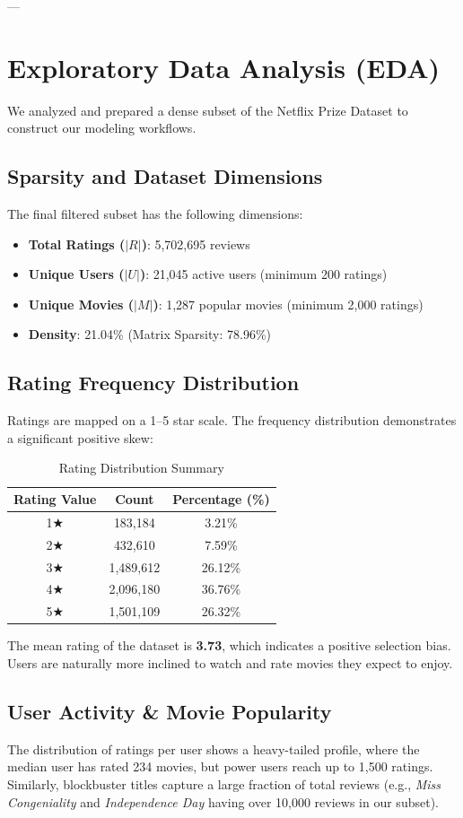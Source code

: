 \documentclass[11pt,a4paper]{article}
\begin{document}
---

\section{Exploratory Data Analysis (EDA)}
We analyzed and prepared a dense subset of the Netflix Prize Dataset to construct our modeling workflows. 

\subsection{Sparsity and Dataset Dimensions}
The final filtered subset has the following dimensions:
\begin{itemize}
    \item \textbf{Total Ratings ($|R|$)}: 5,702,695 reviews
    \item \textbf{Unique Users ($|U|$)}: 21,045 active users (minimum 200 ratings)
    \item \textbf{Unique Movies ($|M|$)}: 1,287 popular movies (minimum 2,000 ratings)
    \item \textbf{Density}: 21.04\% (Matrix Sparsity: 78.96\%)
\end{itemize}

\subsection{Rating Frequency Distribution}
Ratings are mapped on a 1--5 star scale. The frequency distribution demonstrates a significant positive skew:
\begin{table}[h]
\centering
\caption{Rating Distribution Summary}
\begin{tabular}{ccc}
\toprule
\textbf{Rating Value} & \textbf{Count} & \textbf{Percentage (\%)} \\
\midrule
1★ & 183,184 & 3.21\% \\
2★ & 432,610 & 7.59\% \\
3★ & 1,489,612 & 26.12\% \\
4★ & 2,096,180 & 36.76\% \\
5★ & 1,501,109 & 26.32\% \\
\bottomrule
\end{tabular}
\label{tab:rating_dist}
\end{table}

The mean rating of the dataset is \textbf{3.73}, which indicates a positive selection bias. Users are naturally more inclined to watch and rate movies they expect to enjoy.

\subsection{User Activity \& Movie Popularity}
The distribution of ratings per user shows a heavy-tailed profile, where the median user has rated 234 movies, but power users reach up to 1,500 ratings. Similarly, blockbuster titles capture a large fraction of total reviews (e.g., \textit{Miss Congeniality} and \textit{Independence Day} having over 10,000 reviews in our subset).
\end{document}
